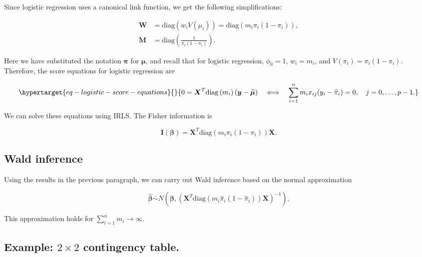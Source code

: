 \documentclass[
  11pt,
  letterpaper,
  oneside]{book}
\theoremstyle{plain}
\theoremstyle{plain}
\theoremstyle{definition}
\theoremstyle{definition}
\theoremstyle{plain}
\theoremstyle{remark}
\begin{document}
Since logistic regression uses a canonical link function, we get the
following simplifications:

\[
\begin{aligned}
\boldsymbol{W} &= \text{diag}\left(w_i V(\mu_i)\right) = \text{diag}\left(m_i \pi_i(1-\pi_i)\right), \\
\boldsymbol{M} &= \text{diag}\left(\frac{1}{\pi_i(1-\pi_i)}\right).
\end{aligned}
\]

Here we have substituted the notation \(\boldsymbol{\pi}\) for
\(\boldsymbol{\mu}\), and recall that for logistic regression,
\(\phi_0 = 1\), \(w_i = m_i\), and \(V(\pi_i) = \pi_i(1-\pi_i)\).
Therefore, the score equations for logistic regression are

\begin{equation}\protect\hypertarget{eq-logistic-score-equations}{}{
0 = \boldsymbol{X}^T \text{diag}\left(m_i\right)(\boldsymbol{y} - \boldsymbol{\widehat{\mu}}) \quad \Longleftrightarrow \quad \sum_{i = 1}^n m_i x_{ij}(y_i-\widehat{\pi}_i) = 0, \quad j = 0, \dots, p-1.
}\label{eq-logistic-score-equations}\end{equation}

We can solve these equations using IRLS. The Fisher information is

\[
\boldsymbol{I}(\boldsymbol{\beta}) = \boldsymbol{X}^T \text{diag}\left(m_i \pi_i(1-\pi_i)\right) \boldsymbol{X}.
\]

\hypertarget{sec-wald-inference}{%
\subsection{Wald inference}\label{sec-wald-inference}}

Using the results in the previous paragraph, we can carry out Wald
inference based on the normal approximation

\[
\boldsymbol{\widehat \beta} \overset \cdot \sim N\left(\boldsymbol \beta, \left(\boldsymbol X^T\text{diag}(m_i \widehat \pi_i(1-\widehat \pi_i))\boldsymbol X\right)^{-1}\right).
\]

This approximation holds for \(\sum_{i = 1}^n m_i \rightarrow \infty\).

\hypertarget{sec-2x2-contingency-table}{%
\subsection{\texorpdfstring{Example: \(2 \times 2\) contingency
table.}{Example: 2 \textbackslash times 2 contingency table.}}\label{sec-2x2-contingency-table}}
\end{document}
